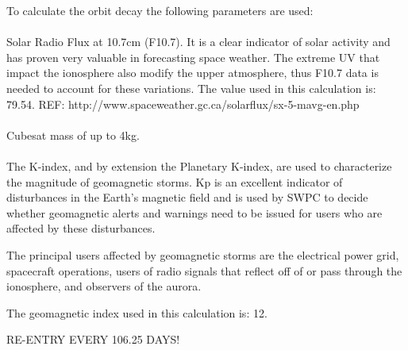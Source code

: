 To calculate the orbit decay the following parameters are used:
\paragraph{}Solar Radio Flux at 10.7cm (F10.7). It is a clear indicator of solar activity and has proven very valuable in forecasting space weather. The extreme UV that impact the ionosphere also modify the upper atmosphere, thus F10.7 data is needed to account for these variations. The value used in this calculation is: 79.54.
REF: http://www.spaceweather.gc.ca/solarflux/sx-5-mavg-en.php

\paragraph{}Cubesat mass of up to 4kg.

\paragraph{}The K-index, and by extension the Planetary K-index, are used to characterize the magnitude of geomagnetic storms. Kp is an excellent indicator of disturbances in the Earth's magnetic field and is used by SWPC to decide whether geomagnetic alerts and warnings need to be issued for users who are affected by these disturbances.

The principal users affected by geomagnetic storms are the electrical power grid, spacecraft operations, users of radio signals that reflect off of or pass through the ionosphere, and observers of the aurora.

The geomagnetic index used in this calculation is: 12.

RE-ENTRY EVERY 106.25 DAYS!


